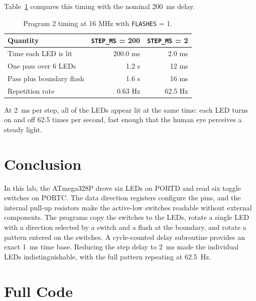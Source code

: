\documentclass[11pt]{article}
\begin{document}
Table~\ref{tab:timing} compares this timing with the nominal 200~ms delay.

\begin{table}[H]
  \centering
  \caption{Program 2 timing at 16 MHz with \texttt{FLASHES} = 1.}
  \label{tab:timing}
  \begin{tabular}{lrr}
    \toprule
    Quantity & \texttt{STEP\_MS} = 200 & \texttt{STEP\_MS} = 2 \\
    \midrule
    Time each LED is lit       & 200.0 ms & 2.0 ms \\
    One pass over 6 LEDs       & 1.2 s    & 12 ms \\
    Pass plus boundary flash   & 1.6 s    & 16 ms \\
    Repetition rate            & 0.63 Hz  & 62.5 Hz \\
    \bottomrule
  \end{tabular}
\end{table}

At 2~ms per step, all of the LEDs appear lit at the same time: each LED turns on and off 62.5 times per second, fast enough that the human eye perceives a steady light.

\section{Conclusion}
In this lab, the ATmega328P drove six LEDs on PORTD and read six toggle switches on PORTC. The data direction registers configure the pins, and the internal pull-up resistors make the active-low switches readable without external components. The programs copy the switches to the LEDs, rotate a single LED with a direction selected by a switch and a flash at the boundary, and rotate a pattern entered on the switches. A cycle-counted delay subroutine provides an exact 1~ms time base. Reducing the step delay to 2~ms made the individual LEDs indistinguishable, with the full pattern repeating at 62.5~Hz.

\appendix
\section{Full Code}
\label{app:code}
\end{document}
